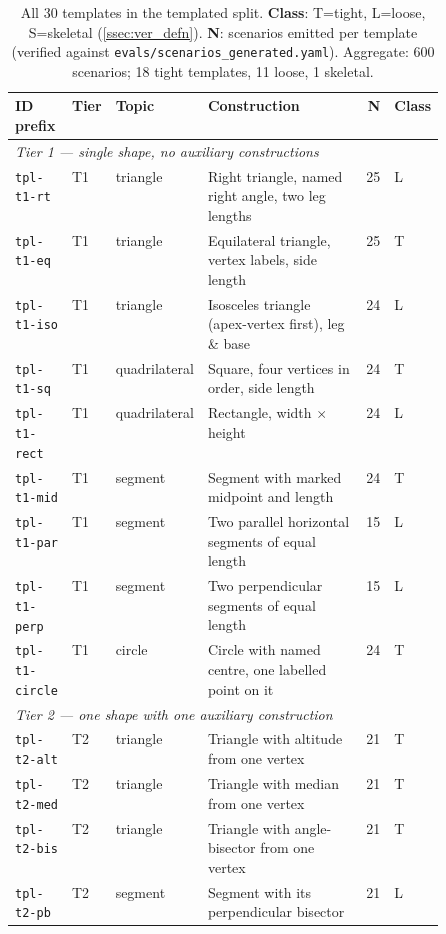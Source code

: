 \begin{table}[t]
\caption{All 30 templates in the templated split. \textbf{Class}: T=tight, L=loose, S=skeletal (\cref{ssec:ver_defn}). \textbf{N}: scenarios emitted per template (verified against \texttt{evals/scenarios\_generated.yaml}). Aggregate: 600 scenarios; 18 tight templates, 11 loose, 1 skeletal.}
\label{tab:template_summary}
\centering
\footnotesize
\setlength{\tabcolsep}{3pt}
\begin{tabular}{@{}lllp{0.50\linewidth}rl@{}}
\toprule
\textbf{ID prefix} & \textbf{Tier} & \textbf{Topic} & \textbf{Construction} & \textbf{N} & \textbf{Class} \\
\midrule
\multicolumn{6}{l}{\textit{Tier 1 --- single shape, no auxiliary constructions}} \\
\texttt{tpl-t1-rt} & T1 & triangle & Right triangle, named right angle, two leg lengths & 25 & L \\
\texttt{tpl-t1-eq} & T1 & triangle & Equilateral triangle, vertex labels, side length & 25 & T \\
\texttt{tpl-t1-iso} & T1 & triangle & Isosceles triangle (apex-vertex first), leg \& base & 24 & L \\
\texttt{tpl-t1-sq} & T1 & quadrilateral & Square, four vertices in order, side length & 24 & T \\
\texttt{tpl-t1-rect} & T1 & quadrilateral & Rectangle, width $\times$ height & 24 & L \\
\texttt{tpl-t1-mid} & T1 & segment & Segment with marked midpoint and length & 24 & T \\
\texttt{tpl-t1-par} & T1 & segment & Two parallel horizontal segments of equal length & 15 & L \\
\texttt{tpl-t1-perp} & T1 & segment & Two perpendicular segments of equal length & 15 & L \\
\texttt{tpl-t1-circle} & T1 & circle & Circle with named centre, one labelled point on it & 24 & T \\
\midrule
\multicolumn{6}{l}{\textit{Tier 2 --- one shape with one auxiliary construction}} \\
\texttt{tpl-t2-alt} & T2 & triangle & Triangle with altitude from one vertex & 21 & T \\
\texttt{tpl-t2-med} & T2 & triangle & Triangle with median from one vertex & 21 & T \\
\texttt{tpl-t2-bis} & T2 & triangle & Triangle with angle-bisector from one vertex & 21 & T \\
\texttt{tpl-t2-pb} & T2 & segment & Segment with its perpendicular bisector & 21 & L \\

\end{tabular}
\end{table}
